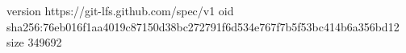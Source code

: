 version https://git-lfs.github.com/spec/v1
oid sha256:76eb016f1aa4019c87150d38bc272791f6d534e767f7b5f53bc414b6a356bd12
size 349692
